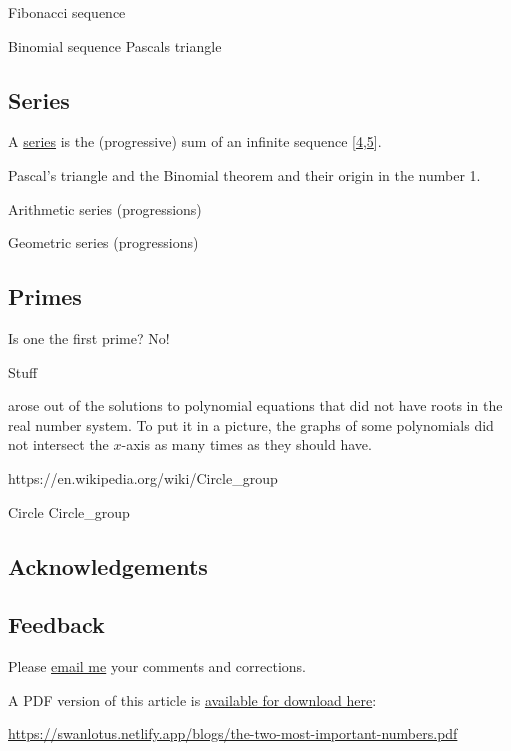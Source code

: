 \documentclass[
  a4paper,
]{article}
\begin{document}
Fibonacci sequence

Binomial sequence Pascals triangle

\hypertarget{series}{%
\subsection{Series}\label{series}}

A \href{https://mathworld.wolfram.com/Series.html}{series} is the
(progressive) sum of an infinite sequence
{[}\protect\hyperlink{ref-wikiseries}{4},\protect\hyperlink{ref-wolframseries}{5}{]}.

Pascal's triangle and the Binomial theorem and their origin in the
number 1.

Arithmetic series (progressions)

Geometric series (progressions)

\hypertarget{primes}{%
\subsection{Primes}\label{primes}}

Is one the first prime? No!

Stuff

arose out of the solutions to polynomial equations that did not have
roots in the real number system. To put it in a picture, the graphs of
some polynomials did not intersect the \(x\)-axis as many times as they
should have.

https://en.wikipedia.org/wiki/Circle\_group

Circle Circle\_group

\hypertarget{acknowledgements}{%
\subsection{Acknowledgements}\label{acknowledgements}}

\hypertarget{feedback}{%
\subsection{Feedback}\label{feedback}}

Please \href{mailto:feedback.swanlotus@gmail.com}{email me} your
comments and corrections.

\noindent A PDF version of this article is
\href{./the-two-most-important-numbers.pdf}{available for download
here}:

\begin{small}

\begin{sffamily}

\url{https://swanlotus.netlify.app/blogs/the-two-most-important-numbers.pdf}

\end{sffamily}

\end{small}
\end{document}
